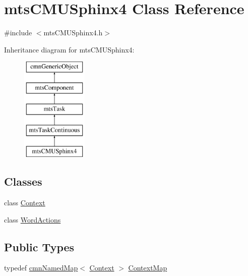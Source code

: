 \hypertarget{classmts_c_m_u_sphinx4}{}\section{mts\+C\+M\+U\+Sphinx4 Class Reference}
\label{classmts_c_m_u_sphinx4}


{\ttfamily \#include $<$mts\+C\+M\+U\+Sphinx4.\+h$>$}

Inheritance diagram for mts\+C\+M\+U\+Sphinx4\+:\begin{figure}[H]
\begin{center}
\leavevmode
\includegraphics[height=5.000000cm]{df/d41/classmts_c_m_u_sphinx4}
\end{center}
\end{figure}
\subsection*{Classes}
\begin{DoxyCompactItemize}
\item 
class \hyperlink{classmts_c_m_u_sphinx4_1_1_context}{Context}
\item 
class \hyperlink{classmts_c_m_u_sphinx4_1_1_word_actions}{Word\+Actions}
\end{DoxyCompactItemize}
\subsection*{Public Types}
\begin{DoxyCompactItemize}
\item 
typedef \hyperlink{classcmn_named_map}{cmn\+Named\+Map}$<$ \hyperlink{classmts_c_m_u_sphinx4_1_1_context}{Context} $>$ \hyperlink{classmts_c_m_u_sphinx4_a5cf708712c99bce418627789835920d8}{Context\+Map}
\end{DoxyCompactItemize}
